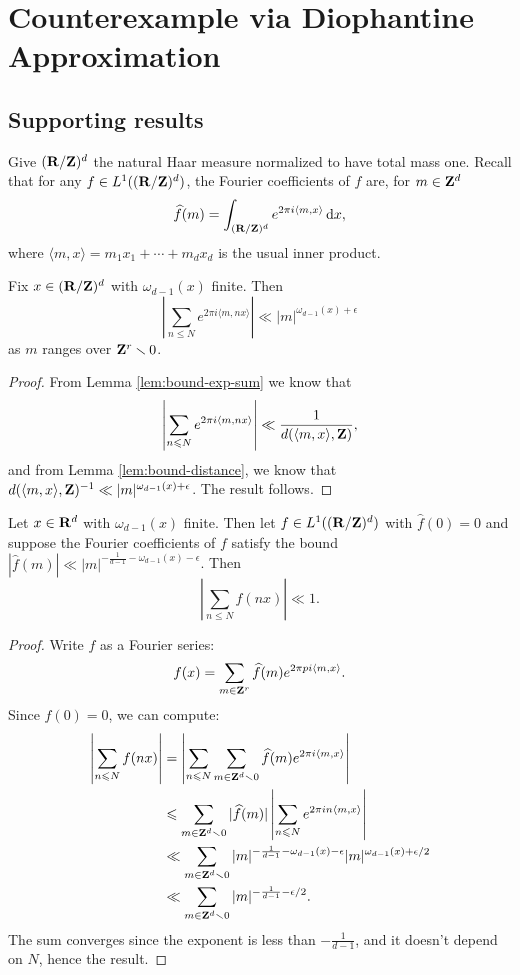 
\chapter{Counterexample via Diophantine Approximation}

\section{Supporting results}

Give $(\mathbf{R}/\mathbf{Z})^d$ the natural Haar measure normalized to have total mass one. 
Recall that for any $f\in L^1((\mathbf{R}/\mathbf{Z})^d)$, the Fourier coefficients of $f$ 
are, for $m\in \mathbf{Z}^d$ 
\[
	\widehat f(m) = \int_{(\mathbf{R}/\mathbf{Z})^d} e^{2\pi i \langle m,x\rangle} \, \mathrm{d} x ,
\]
where $\langle m,x\rangle = m_1 x_1 + \cdots + m_d x_d$ is the usual inner 
product. 

\begin{theorem}
Fix $x\in (\mathbf{R}/\mathbf{Z})^d$ with $\omega_{d-1}(x)$ finite. Then 
\[
	\left| \sum_{n\leqslant N} e^{2\pi i \langle m, n x\rangle}\right| \ll |m|^{\omega_{d-1}(x) + \epsilon} 
\]
as $m$ ranges over $\mathbf{Z}^r\smallsetminus 0$. 
\end{theorem}
\begin{proof}
From Lemma \ref{lem:bound-exp-sum} we know that 
\[
	\left| \sum_{n\leqslant N} e^{2\pi i \langle m, n x\rangle}\right| \ll \frac{1}{d(\langle m, x\rangle,\mathbf{Z})} ,
\]
and from Lemma \ref{lem:bound-distance}, we know that 
$d(\langle m,x\rangle, \mathbf{Z})^{-1} \ll |m|^{\omega_{d-1}(x)+\epsilon}$. The 
result follows. 
\end{proof}

\begin{theorem}
Let $x\in \mathbf{R}^d$ with $\omega_{d-1}(x)$ finite. Then let 
$f\in L^1((\mathbf{R}/\mathbf{Z})^d)$ with $\widehat f(0)=0$ and suppose the Fourier 
coefficients of $f$ satisfy the bound 
$|\widehat f(m)| \ll |m|^{-\frac{1}{d-1} - \omega_{d-1}(x)-\epsilon}$. Then 
\[
	\left| \sum_{n\leqslant N} f(n x)\right| \ll 1. 
\]
\end{theorem}
\begin{proof}
Write $f$ as a Fourier series:
\[
	f(x) = \sum_{m\in \mathbf{Z}^r} \widehat f(m) e^{2\pi pi \langle m,x\rangle} .
\]
Since $\widehat f(0)=0$, we can compute:
\begin{align*}
	\left| \sum_{n\leqslant N} f(n x)\right| 
		&= \left| \sum_{n\leqslant N} \sum_{m\in \mathbf{Z}^d\smallsetminus 0} \widehat f(m) e^{2\pi i \langle m,x\rangle}\right| \\
		&\leqslant \sum_{m\in \mathbf{Z}^d\smallsetminus 0} |\widehat f(m)| \left| \sum_{n\leqslant N} e^{2\pi i n \langle m,x\rangle}\right| \\
		&\ll \sum_{m\in \mathbf{Z}^d\smallsetminus 0} |m|^{-\frac{1}{d-1} - \omega_{d-1}(x) - \epsilon} |m|^{\omega_{d-1}(x) + \epsilon/2} \\
		&\ll \sum_{m\in \mathbf{Z}^d\smallsetminus 0} |m|^{-\frac{1}{d-1} - \epsilon/2} .
\end{align*}
The sum converges since the exponent is less than $-\frac{1}{d-1}$, and it 
doesn't depend on $N$, hence the result. 
\end{proof}





